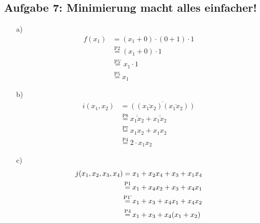 \documentclass{article}
\begin{document}
	\subsection*{Aufgabe 7: Minimierung macht alles einfacher!}
	\begin{enumerate}
		\item[a)]
		\begin{align*}
			f(x_1) &= (x_1 + 0) \cdot (0 + 1) \cdot 1 \\
			&\stackrel{\text{P2}}{=} (x_1 + 0) \cdot 1 \\
			&\stackrel{\text{P5'}}{=} x_1 \cdot 1 \\
			&\stackrel{\text{P5}}{=} x_1
		\end{align*}
		\item[b)]
		\begin{align*}
			i(x_1, x_2) &= \overline{((\overline{x_1 x_2})(\overline{x_1 x_2}))} \\
			&\stackrel{\text{P8}}{=} \overline{\overline{x_1 x_2}} + \overline{\overline{x_1 x_2}} \\
			&\stackrel{\text{P7}}{=} x_1 x_2 + x_1 x_2 \\
			&\stackrel{\text{P4}}{=} 2\cdot x_1 x_2
		\end{align*}
		\item[c)]
		\begin{align*}
			j(x_1, x_2, x_3, x_4) &= x_1 + x_2 x_4 + x_3 + x_1 x_4 \\
			&\stackrel{\mathclap{\text{P1}}}{=} x_1 + x_4 x_2+ x_3 + x_4 x_1 \\
			&\stackrel{\mathclap{\text{P1'}}}{=} x_1 + x_3 + x_4 x_1 + x_4 x_2 \\
			&\stackrel{\mathclap{\text{P4}}}{=} x_1 + x_3 + x_4(x_1 + x_2)
		\end{align*} 
	\end{enumerate}
\end{document}
